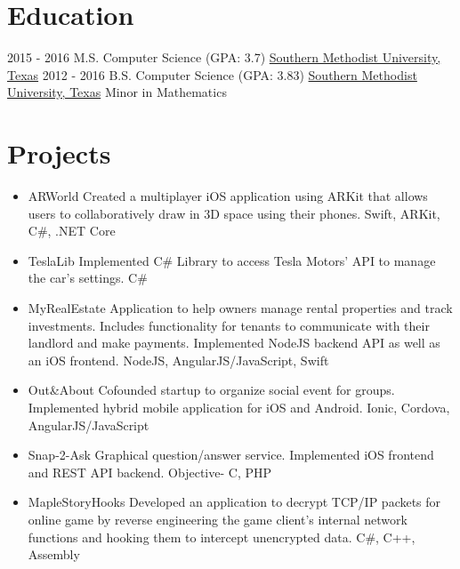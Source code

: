 \documentclass[letterpaper]{twentysecondcv} %
\begin{document}
\section{Education}
\begin{twenty} %
	\twentyitem
	{2015 - 2016}
	{}
	{M.S. Computer Science \textnormal{(GPA: 3.7)}}
	{\href{http://www.smu.edu/}{Southern Methodist University, Texas}}
	{}
	{}
	\twentyitem
	{2012 - 2016}
	{}
	{B.S. Computer Science \textnormal{(GPA: 3.83)}}
	{\href{http://www.smu.edu/}{Southern Methodist University, Texas}}
	{Minor in Mathematics}
	{}
\end{twenty}





\section{Projects}
{\begin{itemize}
		\item ARWorld Created a multiplayer iOS application using ARKit that allows users to collaboratively draw in 3D space using their phones. Swift, ARKit, C\#, .NET Core
		
		\item TeslaLib Implemented C\# Library to access Tesla Motors’ API to manage the car’s settings. C\#
		
		\item MyRealEstate Application to help owners manage rental properties and track investments. Includes functionality
		for tenants to communicate with their landlord and make payments. Implemented NodeJS backend API
		as well as an iOS frontend. NodeJS, AngularJS/JavaScript, Swift
		
		\item Out\&About Cofounded startup to organize social event for groups. Implemented hybrid mobile application for
		iOS and Android. Ionic, Cordova, AngularJS/JavaScript
		
		\item Snap-2-Ask Graphical question/answer service. Implemented iOS frontend and REST API backend. Objective-
		C, PHP
	
		\item MapleStoryHooks Developed an application to decrypt TCP/IP packets for online game by reverse engineering
		the game client’s internal network functions and hooking them to intercept unencrypted data. C\#, C++, Assembly
\end{itemize}}
		
\end{document}
